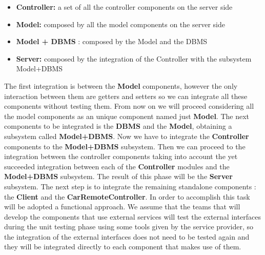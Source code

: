 \begin{itemize}
\item \textbf{Controller:} a set of all the controller components on the server side 
\item \textbf{Model:} composed by all the model components on the server side
\item \textbf{Model + DBMS} : composed by the Model and the DBMS 
\item \textbf{Server:} composed by the integration of the Controller with the subsystem Model+DBMS
\end{itemize}

The first integration is between the \textbf{Model} components, however the only interaction between them are getters and setters so we can integrate  all these components without testing them. From now on we will proceed  considering all the model components as an unique component named just \textbf{Model}. The next components to be integrated is the \textbf{DBMS} and the \textbf{Model}, obtaining a subsystem called \textbf{Model+DBMS}. 
Now we have to integrate the \textbf{Controller} components to the \textbf{Model+DBMS} subsystem. Then we can proceed to the integration between the controller components taking into account the yet succeeded integration between each of the \textbf{Controller} modules and the \textbf{Model+DBMS} subsystem. The result of this phase will be the \textbf{Server} subsystem. The next step is to integrate the  remaining standalone components : the \textbf{Client} and the \textbf{CarRemoteController}. In order to accomplish this task will be adopted a functional approach. 
We assume that the teams that will develop the components that use external services will test the external interfaces during the unit testing phase using some tools given by the service provider, so the integration of the external interfaces does not need to be tested again and they will be integrated directly to each component that makes use of them.

\newpage
